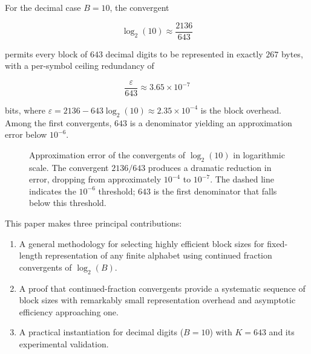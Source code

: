 \documentclass[10pt, conference]{IEEEtran}
\begin{document}
For the decimal case \(B=10\), the convergent

\[
\log_2(10)\approx\frac{2136}{643}
\]

permits every block of \(643\) decimal digits to be represented in exactly \(267\) bytes, with a per-symbol ceiling redundancy of

\[
\frac{\varepsilon}{643} \approx 3.65\times10^{-7}
\]

bits, where \(\varepsilon = 2136 - 643\log_2(10) \approx 2.35\times10^{-4}\) is the block overhead. Among the first convergents, \(643\) is a denominator yielding an approximation error below \(10^{-6}\).

\begin{figure}[ht]
\centering
{}
\caption{Approximation error of the convergents of $\log_2(10)$ in logarithmic scale. The convergent $2136/643$ produces a dramatic reduction in error, dropping from approximately $10^{-4}$ to $10^{-7}$. The dashed line indicates the $10^{-6}$ threshold; $643$ is the first denominator that falls below this threshold.}
\label{fig:error}
\end{figure}

This paper makes three principal contributions:

\begin{enumerate}

\item A general methodology for selecting highly efficient block sizes for fixed-length representation of any finite alphabet using continued fraction convergents of $\log_2(B)$.

\item A proof that continued-fraction convergents provide a systematic sequence of block sizes with remarkably small representation overhead and asymptotic efficiency approaching one.

\item A practical instantiation for decimal digits ($B=10$) with $K=643$ and its experimental validation.

\end{enumerate}
\end{document}

